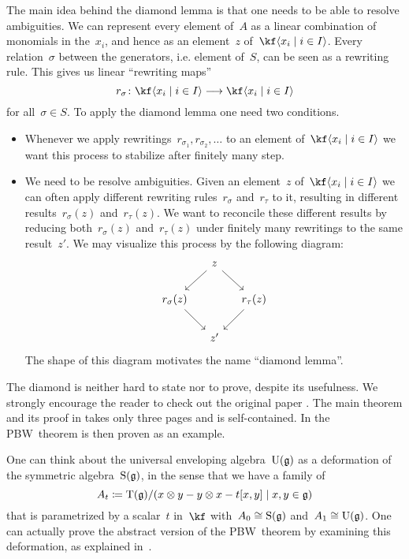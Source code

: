 \begin{remark}
  The main idea behind the diamond lemma is that one needs to be able to resolve ambiguities.
  We can represent every element of~$A$ as a linear combination of monomials in the~$x_i$, and hence as an element~$z$ of~$\kf\gen{x_i \suchthat i \in I}$.
  Every relation~$\sigma$ between the generators, i.e. element of~$S$, can be seen as a rewriting rule.
  This gives us linear \enquote{rewriting maps}
  \[
    r_\sigma
    \colon
    \kf\gen{x_i \suchthat i \in I}
    \to
    \kf\gen{x_i \suchthat i \in I}
  \]
  for all~$\sigma \in S$.
  To apply the diamond lemma one need two conditions.
  \begin{itemize}
    \item
      Whenever we apply rewritings~$r_{\sigma_1}, r_{\sigma_2}, \dotsc$ to an element of~$\kf\gen{x_i \suchthat i \in I}$ we want this process to stabilize after finitely many step.
    \item
      We need to be resolve ambiguities.
      Given an element~$z$ of~$\kf\gen{x_i \suchthat i \in I}$ we can often apply different rewriting rules~$r_\sigma$ and~$r_\tau$ to it, resulting in different results~$r_\sigma(z)$ and~$r_\tau(z)$.
      We want to reconcile these different results by reducing both~$r_\sigma(z)$ and~$r_\tau(z)$ under finitely many rewritings to the same result~$z'$.
      We may visualize this process by the following diagram:
      \[
        \begin{tikzcd}[column sep = small]
          {}
          &
          z
          \arrow{dl}
          \arrow{dr}
          &
          {}
          \\
          r_\sigma(z)
          \arrow{dr}
          &
          {}
          &
          r_\tau(z)
          \arrow{dl}
          \\
          {}
          &
          z'
          &
          {}
        \end{tikzcd}
      \]
      The shape of this diagram motivates the name \enquote{diamond lemma}.
  \end{itemize}
  
  The diamond is neither hard to state nor to prove, despite its usefulness.
  We strongly encourage the reader to check out the original paper \cite{diamond_lemma}.
  The main theorem and its proof in \cite[\S 1]{diamond_lemma} takes only three pages and is self-contained.
  In \cite[\S 3]{diamond_lemma} the PBW~theorem is then proven as an example.
\end{remark}


\begin{remark}
  One can think about the universal enveloping algebra~$\operatorname{U}(\mathfrak{g})$ as a deformation of the symmetric algebra~$\operatorname{S}(\mathfrak{g})$, in the sense that we have a family of~\algebras{$\kf$}
  \[
    A_t
    \defined
    \Tensor(\glie)
    /
    \ideal{ x \tensor y - y \tensor x - t[x,y] \suchthat x, y \in \glie }
  \]
  that is parametrized by a scalar~$t$ in~$\kf$ with~$A_0 \cong \operatorname{S}(\mathfrak{g})$ and~$A_1 \cong \operatorname{U}(\mathfrak{g})$.
  One can actually prove the abstract version of the PBW~theorem by examining this deformation, as explained in~\cite{pbw_deformation}.
\end{remark}





